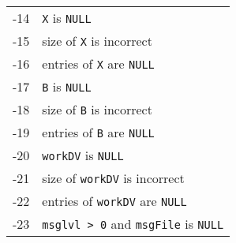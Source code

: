 \begin{enumerate}
\begin{center}
\begin{tabular}{rl}
-14 & {\tt X} is {\tt NULL} \\
-15 & size of {\tt X} is incorrect \\
-16 & entries of {\tt X} are {\tt NULL} \\
-17 & {\tt B} is {\tt NULL} \\
-18 & size of {\tt B} is incorrect \\
-19 & entries of {\tt B} are {\tt NULL} \\
-20 & {\tt workDV} is {\tt NULL} \\
-21 & size of {\tt workDV} is incorrect \\
-22 & entries of {\tt workDV} are {\tt NULL} \\
-23 & {\tt msglvl > 0} and {\tt msgFile} is {\tt NULL} \\
\end{tabular}
\end{center}
\end{enumerate}
\par
